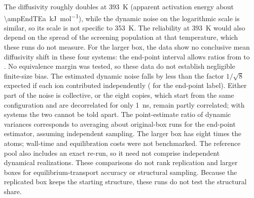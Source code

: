 \documentclass[11pt]{article}
\begin{document}
\begin{table}[ht]
\centering
\caption{Higher temperature and larger box: ratio of the diffusivity to the reference from the
same structure, and dynamic noise (SD of $\ln D$ between runs from the same structure).}\label{si:tab:extension}
\end{table}

The diffusivity roughly doubles at \SI{393}{\kelvin} (apparent activation energy about
\SI{\ampEndTEa}{\kilo\joule\per\mole}), while the dynamic noise on the logarithmic scale is similar,
so its scale is not specific to \SI{353}{\kelvin}. The reliability at \SI{393}{\kelvin} would also
depend on the spread of the screening population at that temperature, which these runs do not
measure. For the larger box, the data show no conclusive mean diffusivity shift in these four systems:
the end-point interval
allows ratios from \ampEndBoxRatioLo{} to \ampEndBoxRatioHi{}. No equivalence margin was tested,
so these data do not establish negligible finite-size bias. The estimated
dynamic noise falls by less than the factor $1/\sqrt{8}$ expected if each ion contributed
independently (\ampStatNoise{} for the end-point label). Either part of the noise is collective, or
the eight copies, which start from the same configuration and are decorrelated for only
\SI{1}{\nano\second}, remain partly correlated; with \ampBoxN{} systems the two cannot be told apart.
The point-estimate ratio of dynamic variances corresponds to averaging about
\ampEndBoxEquivRuns{} original-box runs for the end-point estimator, assuming independent
sampling. The larger box has eight times the atoms; wall-time and equilibration costs were
not benchmarked. The reference pool also includes an exact re-run, so it need not comprise
independent dynamical realizations. These comparisons do not rank replication and larger
boxes for equilibrium-transport accuracy or structural sampling.
Because the replicated box keeps the starting structure, these runs do not test the structural
share.
\end{document}
